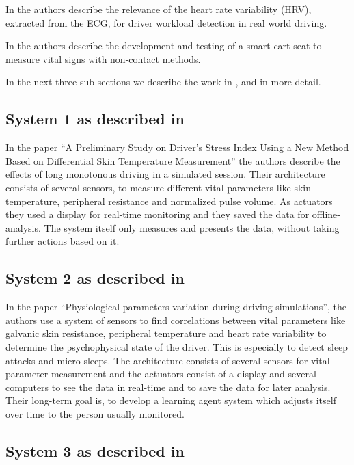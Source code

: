 \documentclass[a4paper]{article}
\begin{document}
In \cite{eilebrecht:12} the authors describe the relevance of the heart rate variability (HRV), extracted from the ECG, for driver workload detection in real world driving.

In \cite{walter:11} the authors describe the development and testing of a smart cart seat to measure vital signs with non-contact methods.

In the next three sub sections we describe the work in \cite{yamakoshi:07}, \cite{Zocchi:07} and \cite{angelo:10} in more detail.
\subsection{System 1 as described in\cite{yamakoshi:07}}
In the paper ``A Preliminary Study on Driver's Stress Index Using a New Method Based on Differential Skin Temperature Measurement'' the authors describe the effects of long monotonous driving in a simulated session. Their architecture consists of several sensors, to measure different vital parameters like skin temperature, peripheral resistance and normalized pulse volume. As actuators they used a display for real-time monitoring and they saved the data for offline-analysis.
The system itself only measures and presents the data, without taking further actions based on it.
\subsection{System 2 as described in \cite{Zocchi:07}}
In the paper ``Physiological parameters variation during driving simulations'', the authors use a system of sensors to find correlations between vital parameters like galvanic skin resistance, peripheral temperature and heart rate variability to determine the psychophysical state of the driver. This is especially to detect sleep attacks and micro-sleeps. The architecture consists of several sensors for vital parameter measurement and the actuators consist of a display and several computers to see the data in real-time and to save the data for later analysis. Their long-term goal is, to develop a learning agent system which adjusts itself over time to the person usually monitored.
\subsection{System 3 as described in \cite{angelo:10}}
%
%
\end{document}
